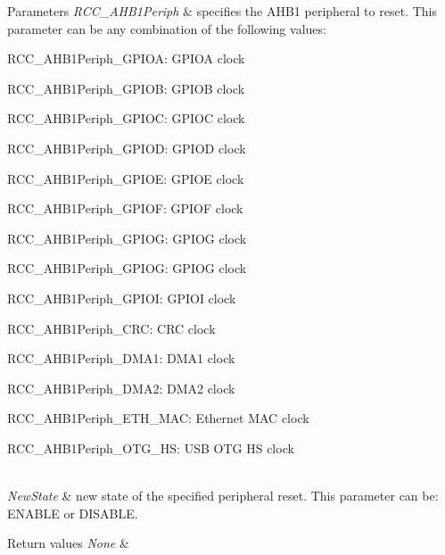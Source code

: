 \begin{DoxyParams}{Parameters}
{\em R\+C\+C\+\_\+\+A\+H\+B1\+Periph} & specifies the A\+H\+B1 peripheral to reset. This parameter can be any combination of the following values\+: \begin{DoxyItemize}
\item R\+C\+C\+\_\+\+A\+H\+B1\+Periph\+\_\+\+G\+P\+I\+OA\+: G\+P\+I\+OA clock \item R\+C\+C\+\_\+\+A\+H\+B1\+Periph\+\_\+\+G\+P\+I\+OB\+: G\+P\+I\+OB clock \item R\+C\+C\+\_\+\+A\+H\+B1\+Periph\+\_\+\+G\+P\+I\+OC\+: G\+P\+I\+OC clock \item R\+C\+C\+\_\+\+A\+H\+B1\+Periph\+\_\+\+G\+P\+I\+OD\+: G\+P\+I\+OD clock \item R\+C\+C\+\_\+\+A\+H\+B1\+Periph\+\_\+\+G\+P\+I\+OE\+: G\+P\+I\+OE clock \item R\+C\+C\+\_\+\+A\+H\+B1\+Periph\+\_\+\+G\+P\+I\+OF\+: G\+P\+I\+OF clock \item R\+C\+C\+\_\+\+A\+H\+B1\+Periph\+\_\+\+G\+P\+I\+OG\+: G\+P\+I\+OG clock \item R\+C\+C\+\_\+\+A\+H\+B1\+Periph\+\_\+\+G\+P\+I\+OG\+: G\+P\+I\+OG clock \item R\+C\+C\+\_\+\+A\+H\+B1\+Periph\+\_\+\+G\+P\+I\+OI\+: G\+P\+I\+OI clock \item R\+C\+C\+\_\+\+A\+H\+B1\+Periph\+\_\+\+C\+RC\+: C\+RC clock \item R\+C\+C\+\_\+\+A\+H\+B1\+Periph\+\_\+\+D\+M\+A1\+: D\+M\+A1 clock \item R\+C\+C\+\_\+\+A\+H\+B1\+Periph\+\_\+\+D\+M\+A2\+: D\+M\+A2 clock \item R\+C\+C\+\_\+\+A\+H\+B1\+Periph\+\_\+\+E\+T\+H\+\_\+\+M\+AC\+: Ethernet M\+AC clock \item R\+C\+C\+\_\+\+A\+H\+B1\+Periph\+\_\+\+O\+T\+G\+\_\+\+HS\+: U\+SB O\+TG HS clock\end{DoxyItemize}
\\
\hline
{\em New\+State} & new state of the specified peripheral reset. This parameter can be\+: E\+N\+A\+B\+LE or D\+I\+S\+A\+B\+LE. \\
\hline
\end{DoxyParams}

\begin{DoxyRetVals}{Return values}
{\em None} & \\
\hline
\end{DoxyRetVals}
